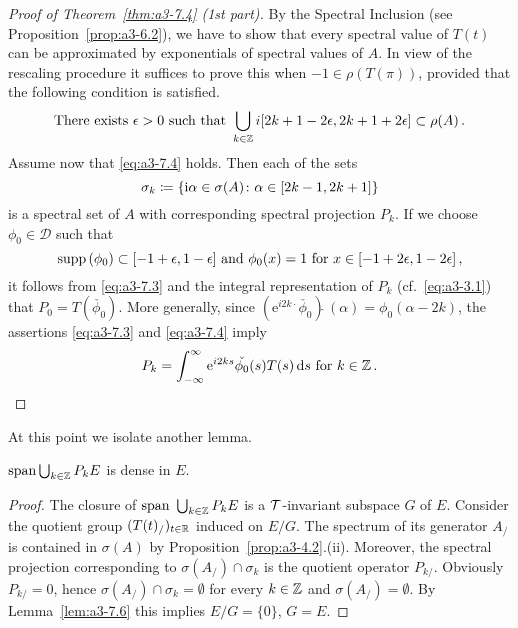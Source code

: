 \begin{proof}[Proof of Theorem~\ref{thm:a3-7.4} (1st part)]
By the Spectral Inclusion (see Proposition~\ref{prop:a3-6.2}), we have to show that every spectral value of $T(t)$ can be approximated by exponentials of spectral values of $A$.
In view of the rescaling procedure it suffices to prove this when $-1 \in \rho(T(\pi))$, provided that the following condition is satisfied.
\begin{equation}\label{eq:a3-7.4}
\text{There exists } \epsilon > 0 \text{ such that } \bigcup_{k\in\mathbb{Z}} i[2k+1-2\epsilon,2k+1+2\epsilon] \subset \rho(A)\,.
\end{equation}
Assume now that \eqref{eq:a3-7.4} holds.
Then each of the sets 
\[
\sigma_{k}\coloneqq \{\mathrm{i}\alpha \in \sigma(A) \colon \alpha \in [2k-1,2k+1]\}
\] 
is a spectral set of $A$ with corresponding spectral projection $P_{k}$.
If we choose $\phi_{0} \in \mathcal{D}$ such that 
\[
\mathop{}\!\mathrm{supp}\,(\phi_{0}) \subset [-1+\epsilon,1-\epsilon] \text{ and } \phi_{0}(x) = 1 \text{ for } x \in [-1+2\epsilon,1-2\epsilon]\,,
\]
it follows from \eqref{eq:a3-7.3} and the integral representation of $P_{k}$ (cf.\ \eqref{eq:a3-3.1}) that $P_{0} = T(\check{\phi_{0}})$.
More generally, since $\left(\mathrm{e}^{i2k\cdot}\check{\phi_{0}}\right){\hat{ }}\,(\alpha) = \phi_{0}(\alpha-2k)$, the assertions \eqref{eq:a3-7.3} and \eqref{eq:a3-7.4} imply
\begin{equation}\label{eq:a3-7.5}
P_{k} = \int_{-\infty}^{\infty} \mathrm{e}^{i2ks}\check{\phi_{0}}(s)T(s)\mathop{}\!\mathrm{d}{s} \text{ for } k \in \mathbb{Z}\,.
\end{equation}
\end{proof}
At this point we isolate another lemma.
\begin{lemma}\label{lem:a3-7.7}
$\mathrm{span }\bigcup_{k\in\mathbb{Z}} P_{k}E$ is dense in $E$.
\end{lemma}
\begin{proof}
The closure of $\text{span }\bigcup_{k\in\mathbb{Z}} P_{k}E$ is a $\mathcal{T}$-invariant subspace $G$ of $E$.
Consider the quotient group $(T(t)_/)_{t\in\mathbb{R}}$ induced on $E/G$.
The spectrum of its generator $A_{/}$ is contained in $\sigma(A)$ by Proposition~\ref{prop:a3-4.2}.(ii).
Moreover, the spectral projection corresponding to $\sigma(A_{/}) \cap \sigma_{k}$ is the quotient operator $P_{k/}$.
Obviously $P_{k/} = 0$, hence $\sigma(A_{/}) \cap \sigma_{k} = \emptyset$ for every $k \in \mathbb{Z}$ and $\sigma(A_{/}) = \emptyset$.
By Lemma~\ref{lem:a3-7.6} this implies $E/G = \{0\}$, \ie $G = E$.
\end{proof}
